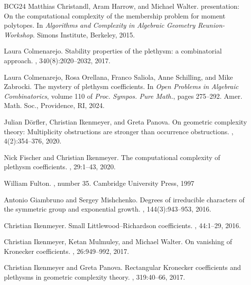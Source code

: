 \documentclass[11pt]{amsart}
\theoremstyle{plain}
\theoremstyle{definition}
\numberwithin{equation}{section}
\begin{document}
\begin{thebibliography}{BCG{\etalchar{+}}24}
Matthias Christandl, Aram Harrow, and Michael Walter.
\newblock presentation: On the computational complexity of the membership
  problem for moment polytopes.
\newblock In {\em Algorithms and Complexity in Algebraic Geometry
  Reunion-Workshop}. Simons Institute, Berkeley, 2015.

Laura Colmenarejo.
\newblock Stability properties of the plethysm: a combinatorial approach.
, 340(8):2020--2032, 2017.

Laura Colmenarejo, Rosa Orellana, Franco Saliola, Anne Schilling, and Mike
  Zabrocki.
\newblock The mystery of plethysm coefficients.
\newblock In {\em Open Problems in Algebraic Combinatorics}, volume 110 of {\em
  Proc. Sympos. Pure Math.}, pages 275--292. Amer. Math. Soc., Providence, RI,
  2024.

Julian D\"orfler, Christian Ikenmeyer, and Greta Panova.
\newblock On geometric complexity theory: Multiplicity obstructions are
  stronger than occurrence obstructions.
, 4(2):354--376,
  2020.

Nick Fischer and Christian Ikenmeyer.
\newblock The computational complexity of plethysm coefficients.
, 29:1--43, 2020.

  William Fulton.
  , number 35.
  \newblock Cambridge University Press, 1997


Antonio Giambruno and Sergey Mishchenko.
\newblock Degrees of irreducible characters of the symmetric group and
  exponential growth.
,
  144(3):943--953, 2016.
  
Christian Ikenmeyer.
\newblock Small Littlewood--Richardson coefficients.
, 44:1--29, 2016.

Christian Ikenmeyer, Ketan Mulmuley, and Michael Walter.
\newblock On vanishing of {K}ronecker coefficients.
, 26:949--992, 2017.


Christian Ikenmeyer and Greta Panova.
\newblock Rectangular {K}ronecker coefficients and plethysms in geometric
  complexity theory.
, 319:40--66, 2017.


\end{thebibliography}
\end{document}
